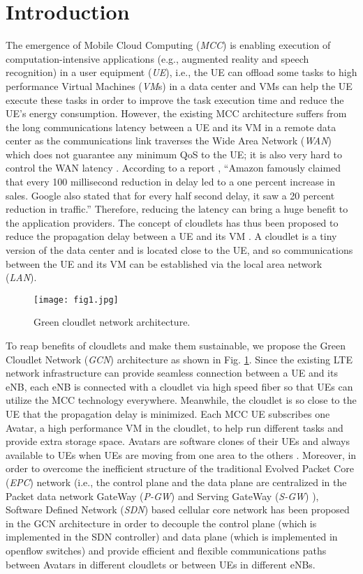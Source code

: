 \documentclass[journal,12pt,draftclsnofoot,onecolumn]{IEEEtran}
\begin{document}
\section{Introduction}
The emergence of Mobile Cloud Computing (\emph{MCC}) is enabling execution of computation-intensive applications (e.g., augmented reality and speech recognition) in a user equipment (\emph{UE}), i.e., the UE can offload some tasks to high performance Virtual Machines (\emph{VM}s) in a data center and VMs can help the UE execute these tasks in order to improve the task execution time and reduce the UE's energy consumption. However, the existing MCC architecture suffers from the long communications latency between a UE and its VM in a remote data center as the communications link traverses the Wide Area Network (\emph{WAN}) which does not guarantee any minimum QoS to the UE; it is also very hard to control the WAN latency \cite{1}. According to a report \cite{2}, “Amazon famously claimed that every 100 millisecond reduction in delay led to a one percent increase in sales. Google also stated that for every half second delay, it saw a 20 percent reduction in traffic.” Therefore, reducing the latency can bring a huge benefit to the application providers. The concept of cloudlets has thus been proposed to reduce the propagation delay between a UE and its VM \cite{1}. A cloudlet is a tiny version of the data center and is located close to the UE, and so communications between the UE and its VM can be established via the local area network (\emph{LAN}).\
\begin{figure}[!htb]
	\centering	
\texttt{[image: fig1.jpg]}
	\caption{Green cloudlet network architecture.}	
	\label{fig1}
\end{figure}

To reap benefits of cloudlets and make them sustainable, we propose the Green Cloudlet Network (\emph{GCN}) architecture as shown in Fig. \ref{fig1}. Since the existing LTE network infrastructure can provide seamless connection between a UE and its eNB, each eNB is connected with a cloudlet via high speed fiber so that UEs can utilize the MCC technology everywhere. Meanwhile, the cloudlet is so close to the UE that the propagation delay is minimized. Each MCC UE subscribes one Avatar, a high performance VM in the cloudlet, to help run different tasks and provide extra storage space. Avatars are software clones of their UEs and always available to UEs when UEs are moving from one area to the others \cite{3}. Moreover, in order to overcome the inefficient structure of the traditional Evolved Packet Core (\emph{EPC}) network (i.e., the control plane and the data plane are centralized in the Packet data network GateWay (\emph{P-GW}) and Serving GateWay (\emph{S-GW}) \cite{4}),  Software Defined Network (\emph{SDN}) based cellular core network \cite{5} has been proposed in the GCN architecture in order to decouple the control plane (which is implemented in the SDN controller) and data plane (which is implemented in openflow switches) and provide  efficient and flexible communications paths between Avatars in different cloudlets or between UEs in different eNBs.  \
\end{document}
